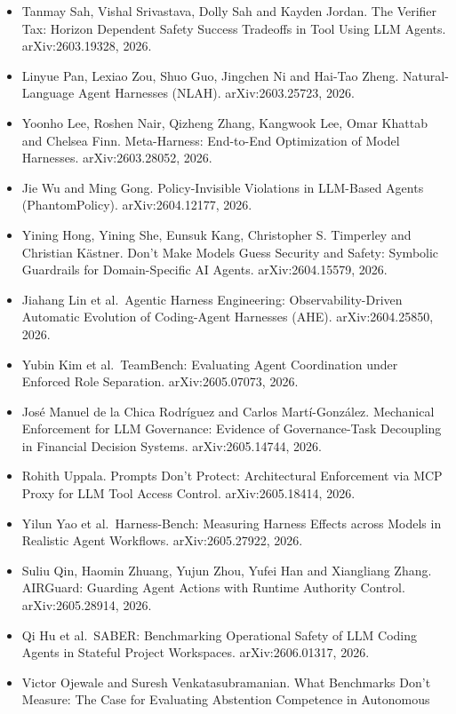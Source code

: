 \documentclass{article}
\begin{document}
\begin{itemize}
  Constraints from Agent Instruction Files. arXiv:2603.00822, 2026.
\item
  Tanmay Sah, Vishal Srivastava, Dolly Sah and Kayden Jordan. The
  Verifier Tax: Horizon Dependent Safety Success Tradeoffs in Tool Using
  LLM Agents. arXiv:2603.19328, 2026.
\item
  Linyue Pan, Lexiao Zou, Shuo Guo, Jingchen Ni and Hai-Tao Zheng.
  Natural-Language Agent Harnesses (NLAH). arXiv:2603.25723, 2026.
\item
  Yoonho Lee, Roshen Nair, Qizheng Zhang, Kangwook Lee, Omar Khattab and
  Chelsea Finn. Meta-Harness: End-to-End Optimization of Model
  Harnesses. arXiv:2603.28052, 2026.
\item
  Jie Wu and Ming Gong. Policy-Invisible Violations in LLM-Based Agents
  (PhantomPolicy). arXiv:2604.12177, 2026.
\item
  Yining Hong, Yining She, Eunsuk Kang, Christopher S. Timperley and
  Christian Kästner. Don't Make Models Guess Security and Safety:
  Symbolic Guardrails for Domain-Specific AI Agents. arXiv:2604.15579,
  2026.
\item
  Jiahang Lin et al.~Agentic Harness Engineering: Observability-Driven
  Automatic Evolution of Coding-Agent Harnesses (AHE). arXiv:2604.25850,
  2026.
\item
  Yubin Kim et al.~TeamBench: Evaluating Agent Coordination under
  Enforced Role Separation. arXiv:2605.07073, 2026.
\item
  José Manuel de la Chica Rodríguez and Carlos Martí-González.
  Mechanical Enforcement for LLM Governance: Evidence of Governance-Task
  Decoupling in Financial Decision Systems. arXiv:2605.14744, 2026.
\item
  Rohith Uppala. Prompts Don't Protect: Architectural Enforcement via
  MCP Proxy for LLM Tool Access Control. arXiv:2605.18414, 2026.
\item
  Yilun Yao et al.~Harness-Bench: Measuring Harness Effects across
  Models in Realistic Agent Workflows. arXiv:2605.27922, 2026.
\item
  Suliu Qin, Haomin Zhuang, Yujun Zhou, Yufei Han and Xiangliang Zhang.
  AIRGuard: Guarding Agent Actions with Runtime Authority Control.
  arXiv:2605.28914, 2026.
\item
  Qi Hu et al.~SABER: Benchmarking Operational Safety of LLM Coding
  Agents in Stateful Project Workspaces. arXiv:2606.01317, 2026.
\item
  Victor Ojewale and Suresh Venkatasubramanian. What Benchmarks Don't
  Measure: The Case for Evaluating Abstention Competence in Autonomous

\end{itemize}
\end{document}
